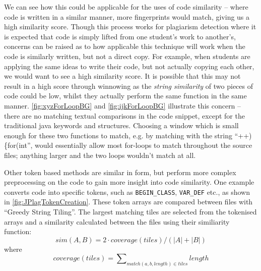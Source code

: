 We can see how this could be applicable for the uses of code similarity -- 
where code is written in a similar manner, more fingerprints would match,
giving us a high similarity score. Though this process works for plagiarism detection
where it is expected that code is simply lifted from one student's work to
another's, concerns can be raised as to how applicable this technique will work
when the code is similarly written, but not a direct copy. For example, when 
students are applying the same ideas to write their code, but not actually
copying each other, we would want to see a high similarity score. It is possible
that this may not result in a high score through winnowing as the \emph{string
similarity} of two pieces of code could be low, whilst they actually perform
the same function in the same manner. \cref{fig:xyzForLoopBG} and
\cref{fig:ijkForLoopBG} illustrate this concern -- there are no matching
textual comparisons in the code snippet, except for the traditional java
keywords and structures. Choosing a window which is small enough for
these two functions to match, e.g. by matching with the string 
``++)\{for(int'', would essentially allow most for-loops to match throughout
the source files; anything larger and the two loops wouldn't match at all.

Other token based methods are similar in form, but perform
more complex preprocessing on the code to gain more insight into code similarity.
One example converts code into specific tokens, such as \texttt{BEGIN\_CLASS}, \texttt{VAR\_DEF}
etc., as shown in \cref{fig:JPlagTokenCreation}. These token arrays are 
compared between files with ``Greedy String Tiling''\cite{GreedyStringTiling}.
The largest matching tiles are selected from the tokenised arrays and a similarity
calculated between the files using their similiarity function:
\[sim(A,B) = 2 \cdot
coverage(tiles)/(|A| + |B|)\] where \[coverage(tiles) =
\sum\nolimits_{match(a,b,length) \in tiles}length\]
\cite{JPlag}


